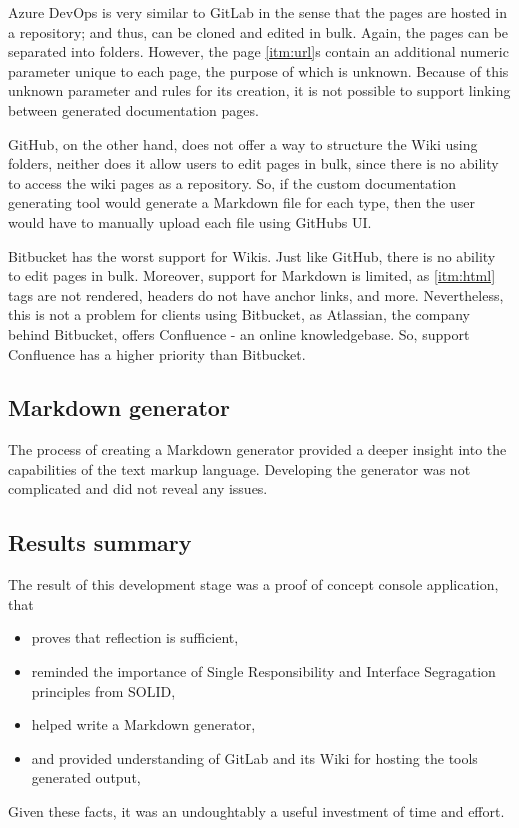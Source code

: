Azure DevOps is very similar to GitLab in the sense that the pages are hosted in a repository; and thus, can be cloned and edited in bulk. Again, the pages can be separated into folders. However, the page \ref{itm:url}s contain an additional numeric parameter unique to each page, the purpose of which is unknown. Because of this unknown parameter and rules for its creation, it is not possible to support linking between generated documentation pages.

GitHub, on the other hand, does not offer a way to structure the Wiki using folders, neither does it allow users to edit pages in bulk, since there is no ability to access the wiki pages as a repository. So, if the custom documentation generating tool would generate a Markdown file for each type, then the user would have to manually upload each file using GitHubs UI.

Bitbucket has the worst support for Wikis. Just like GitHub, there is no ability to edit pages in bulk. Moreover, support for Markdown is limited, as \ref{itm:html} tags are not rendered, headers do not have anchor links, and more.
Nevertheless, this is not a problem for clients using Bitbucket, as Atlassian, the company behind Bitbucket, offers Confluence - an online knowledgebase. So, support Confluence has a higher priority than Bitbucket.

\subsection{Markdown generator}

The process of creating a Markdown generator provided a deeper insight into the capabilities of the text markup language. Developing the generator was not complicated and did not reveal any issues.

\subsection{Results summary}

The result of this development stage was a proof of concept console application, that
\begin{itemize}
    \item proves that reflection is sufficient,
    \item reminded the importance of Single Responsibility and Interface Segragation principles from SOLID,
    \item helped write a Markdown generator,
    \item and provided understanding of GitLab and its Wiki for hosting the tools generated output,
\end{itemize}

Given these facts, it was an undoughtably a useful investment of time and effort.